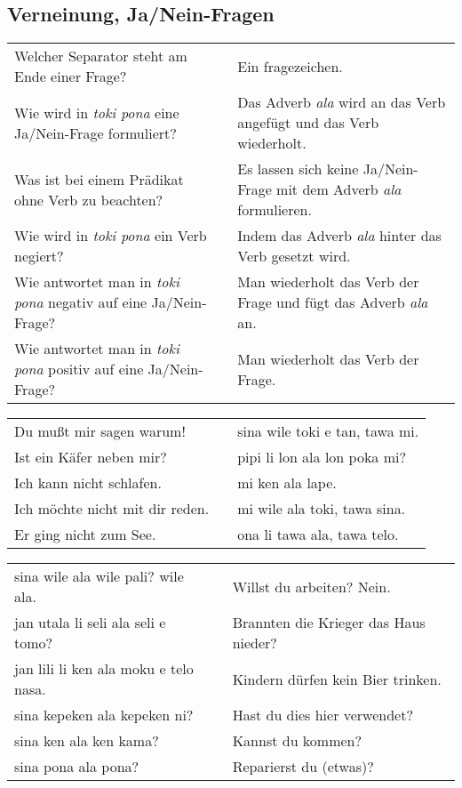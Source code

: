 \newpage
%
\subsection*{Verneinung, Ja/Nein-Fragen} 
\label{'negation_yes_no_questions'}

\begin{supertabular}{p{5,5cm}|ll}
Welcher Separator steht am Ende einer Frage? && Ein fragezeichen. \\ %
Wie wird in \textit{toki pona} eine Ja/Nein-Frage formuliert? && Das Adverb \textit{ala} wird an das Verb angefügt und das Verb wiederholt.  \\ %
Was ist bei einem Prädikat ohne Verb zu beachten? && Es lassen sich keine Ja/Nein-Frage mit dem Adverb \textit{ala} formulieren. \\ %
Wie wird in \textit{toki pona} ein Verb negiert? && Indem das Adverb \textit{ala} hinter das Verb gesetzt wird.  \\ %
Wie antwortet man in \textit{toki pona} negativ auf eine Ja/Nein-Frage? && Man wiederholt das Verb der Frage und fügt das Adverb \textit{ala} an. \\ %
Wie antwortet man in \textit{toki pona} positiv auf eine Ja/Nein-Frage? && Man wiederholt das Verb der Frage. \\ %
\end{supertabular}

\begin{supertabular}{p{5,5cm}|ll}
Du mußt mir sagen warum!  && sina wile toki e tan, tawa mi. \\ %
Ist ein Käfer neben mir?  && pipi li lon ala lon poka mi? \\ %
Ich kann nicht schlafen.  && mi ken ala lape. \\ %
Ich möchte nicht mit dir reden.  && mi wile ala toki, tawa sina. \\ %
Er ging nicht zum See.  && ona li tawa ala, tawa telo. \\ %
\end{supertabular}  

\begin{supertabular}{p{5,5cm}|ll}
sina wile ala wile pali? wile ala.  && Willst du arbeiten? Nein. \\
jan utala li seli ala seli e tomo?  && Brannten die Krieger das Haus nieder? \\
jan lili li ken ala moku e telo nasa.  && Kindern dürfen kein Bier trinken. \\
sina kepeken ala kepeken ni?  && Hast du dies hier verwendet? \\
sina ken ala ken kama?  && Kannst du kommen? \\
sina pona ala pona? && Reparierst du (etwas)? \\
\end{supertabular} 


